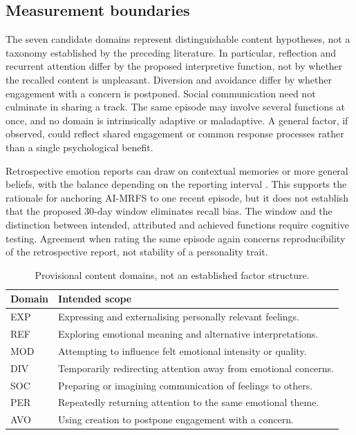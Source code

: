 \subsection{Measurement boundaries}
The seven candidate domains represent distinguishable content hypotheses, not a taxonomy established by the preceding literature. In particular, reflection and recurrent attention differ by the proposed interpretive function, not by whether the recalled content is unpleasant. Diversion and avoidance differ by whether engagement with a concern is postponed. Social communication need not culminate in sharing a track. The same episode may involve several functions at once, and no domain is intrinsically adaptive or maladaptive. A general factor, if observed, could reflect shared engagement or common response processes rather than a single psychological benefit.

Retrospective emotion reports can draw on contextual memories or more general beliefs, with the balance depending on the reporting interval \parencite{robinson2002}. This supports the rationale for anchoring AI-MRFS to one recent episode, but it does not establish that the proposed 30-day window eliminates recall bias. The window and the distinction between intended, attributed and achieved functions require cognitive testing. Agreement when rating the same episode again concerns reproducibility of the retrospective report, not stability of a personality trait.

\begin{table}[ht]
\centering\small
\caption{Provisional content domains, not an established factor structure.}
\begin{tabularx}{\linewidth}{lX}
\toprule
Domain & Intended scope \\
\midrule
EXP & Expressing and externalising personally relevant feelings.\\
REF & Exploring emotional meaning and alternative interpretations.\\
MOD & Attempting to influence felt emotional intensity or quality.\\
DIV & Temporarily redirecting attention away from emotional concerns.\\
SOC & Preparing or imagining communication of feelings to others.\\
PER & Repeatedly returning attention to the same emotional theme.\\
AVO & Using creation to postpone engagement with a concern.\\
\bottomrule
\end{tabularx}
\end{table}
